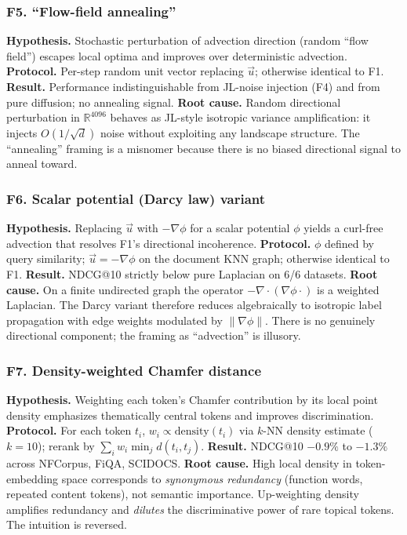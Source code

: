 \documentclass[review,1p,11pt]{elsarticle}
\begin{document}
\subsubsection*{F5. ``Flow-field annealing''}
\textbf{Hypothesis.} Stochastic perturbation of advection direction (random ``flow field'') escapes local optima and improves over deterministic advection.
\textbf{Protocol.} Per-step random unit vector replacing $\vec{u}$; otherwise identical to F1.
\textbf{Result.} Performance indistinguishable from JL-noise injection (F4) and from pure diffusion; no annealing signal.
\textbf{Root cause.} Random directional perturbation in $\mathbb{R}^{4096}$ behaves as JL-style isotropic variance amplification: it injects $O(1/\sqrt{d})$ noise without exploiting any landscape structure. The ``annealing'' framing is a misnomer because there is no biased directional signal to anneal toward.

\subsubsection*{F6. Scalar potential (Darcy law) variant}
\textbf{Hypothesis.} Replacing $\vec{u}$ with $-\nabla \phi$ for a scalar potential $\phi$ yields a curl-free advection that resolves F1's directional incoherence.
\textbf{Protocol.} $\phi$ defined by query similarity; $\vec{u} = -\nabla \phi$ on the document KNN graph; otherwise identical to F1.
\textbf{Result.} NDCG@10 strictly below pure Laplacian on 6/6 datasets.
\textbf{Root cause.} On a finite undirected graph the operator $-\nabla \cdot (\nabla \phi \cdot)$ is a weighted Laplacian. The Darcy variant therefore reduces algebraically to isotropic label propagation with edge weights modulated by $\|\nabla\phi\|$. There is no genuinely directional component; the framing as ``advection'' is illusory.

\subsubsection*{F7. Density-weighted Chamfer distance}
\textbf{Hypothesis.} Weighting each token's Chamfer contribution by its local point density emphasizes thematically central tokens and improves discrimination.
\textbf{Protocol.} For each token $t_i$, $w_i \propto \mathrm{density}(t_i)$ via $k$-NN density estimate ($k=10$); rerank by $\sum_i w_i \min_j d(t_i, t_j)$.
\textbf{Result.} NDCG@10 $-0.9\%$ to $-1.3\%$ across NFCorpus, FiQA, SCIDOCS.
\textbf{Root cause.} High local density in token-embedding space corresponds to \emph{synonymous redundancy} (function words, repeated content tokens), not semantic importance. Up-weighting density amplifies redundancy and \emph{dilutes} the discriminative power of rare topical tokens. The intuition is reversed.
\end{document}

